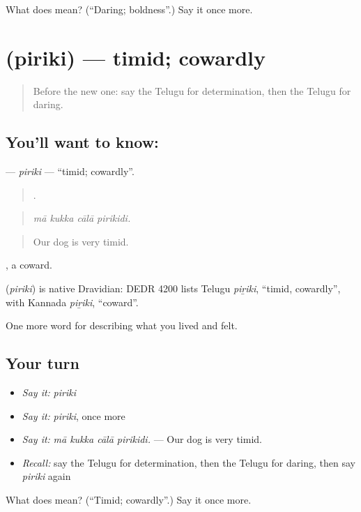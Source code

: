 \begin{tcolorbox}[breakable,colback=teal!4,colframe=teal!35!black,title={Before you move on}]
What does  mean? (\textquotedblleft{}Daring; boldness\textquotedblright{}.) Say it once more.
\end{tcolorbox}
\section[\texorpdfstring{\te{పిరికి} (piriki)}{పిరికి (piriki)}]{ (piriki) — timid; cowardly}

\label{lesson:TE-C508-piriki}



\begin{quote}
Before the new one: say the Telugu for determination, then the Telugu for daring.
\end{quote}

\subsection*{You'll want to know: }
\textbf{} — \emph{piriki} — \textquotedblleft{}timid; cowardly\textquotedblright{}.

\begin{quote}
   .
\end{quote}

\begin{quote}
\emph{mā kukka cālā pirikidi.}
\end{quote}

\begin{quote}
Our dog is very timid.
\end{quote}

, a coward.

\begin{cousinweb}
\textbf{} (\emph{piriki}) is native Dravidian: DEDR 4200 lists Telugu \emph{piṟiki}, \textquotedblleft{}timid, cowardly\textquotedblright{}, with Kannada \emph{piṟiki}, \textquotedblleft{}coward\textquotedblright{}.
\end{cousinweb}

\begin{grammarlens}[title={What you've built}]
One more word for describing what you lived and felt.
\end{grammarlens}

\subsection*{Your turn}
\begin{itemize}
\raggedright
  \item \emph{Say it:} \emph{piriki}
  \item \emph{Say it:} \emph{piriki}, once more
  \item \emph{Say it:} \emph{mā kukka cālā pirikidi.} — Our dog is very timid.
  \item \emph{Recall:} say the Telugu for determination, then the Telugu for daring, then say \emph{piriki} again
\end{itemize}

\begin{tcolorbox}[breakable,colback=teal!4,colframe=teal!35!black,title={Before you move on}]
What does  mean? (\textquotedblleft{}Timid; cowardly\textquotedblright{}.) Say it once more.
\end{tcolorbox}
